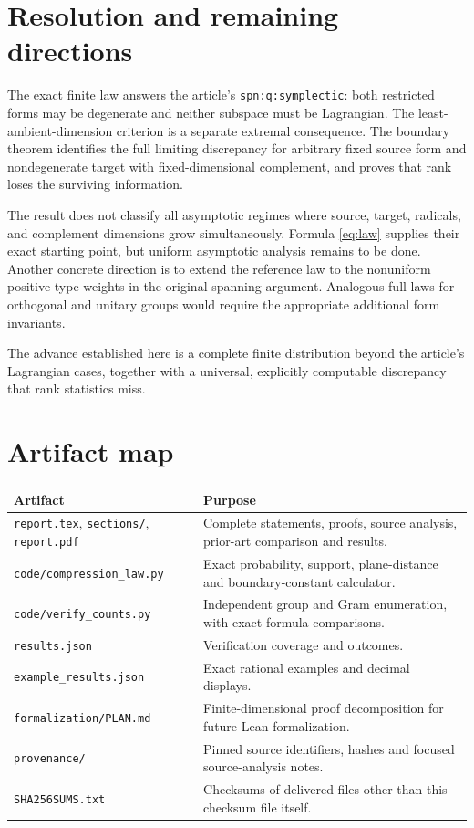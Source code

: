 \section{Resolution and remaining directions}

The exact finite law answers the article's
\texttt{spn:q:symplectic}: both restricted forms may be degenerate
and neither subspace must be Lagrangian. The least-ambient-dimension
criterion is a separate extremal consequence. The boundary theorem
identifies the full limiting discrepancy for arbitrary fixed source
form and nondegenerate target with fixed-dimensional complement,
and proves that rank loses the surviving information.

The result does not classify all asymptotic regimes where source,
target, radicals, and complement dimensions grow simultaneously.
Formula \eqref{eq:law} supplies their exact starting point, but
uniform asymptotic analysis remains to be done. Another concrete
direction is to extend the reference law to the nonuniform
positive-type weights in the original spanning argument.
Analogous full laws for orthogonal and unitary groups would require
the appropriate additional form invariants.

The advance established here is a complete finite distribution
beyond the article's Lagrangian cases, together with a universal,
explicitly computable discrepancy that rank statistics miss.

\appendix
\section{Artifact map}

\begin{longtable}{>{\raggedright\arraybackslash}p{}>{\raggedright\arraybackslash}p{}}
\toprule
Artifact & Purpose\\
\midrule
\endhead
\texttt{report.tex}, \texttt{sections/}, \texttt{report.pdf}
& Complete statements, proofs, source analysis, prior-art comparison and results.\\
\texttt{code/compression\_law.py}
& Exact probability, support, plane-distance and boundary-constant calculator.\\
\texttt{code/verify\_counts.py}
& Independent group and Gram enumeration, with exact formula comparisons.\\
\texttt{results.json}
& Verification coverage and outcomes.\\
\texttt{example\_results.json}
& Exact rational examples and decimal displays.\\
\texttt{formalization/PLAN.md}
& Finite-dimensional proof decomposition for future Lean formalization.\\
\texttt{provenance/}
& Pinned source identifiers, hashes and focused source-analysis notes.\\
\texttt{SHA256SUMS.txt}
& Checksums of delivered files other than this checksum file itself.\\
\bottomrule
\end{longtable}

